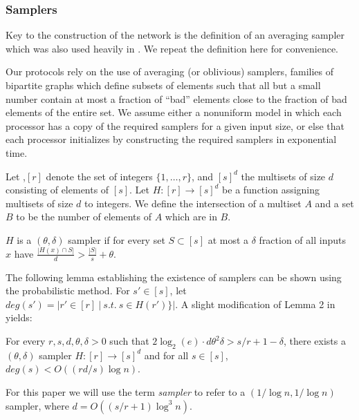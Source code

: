 \documentclass{sig-alternate}
\begin{document}
\subsubsection{Samplers}
Key to the construction of the network is the definition of an averaging sampler which was also used heavily in \cite{KKKSS-TALG,KSSV2}.
We repeat the definition here for convenience. 

Our protocols rely on the use of averaging (or
oblivious) samplers, families of bipartite graphs which define
subsets of elements such that all but a small number contain at
most a fraction of ``bad'' elements close to the fraction of bad
elements of the entire set.  We assume either a nonuniform model in
which each processor has a copy of the required samplers for a
given input size, or else that each processor initializes by
constructing the required samplers in exponential time.

\begin{definition}
Let ,$[r]$ denote the set of integers $\{1, \ldots, r\}$, and
$[s]^{d}$
 the multisets of size $d$ consisting of elements of $[s]$.
Let $H: [r] \rightarrow [s]^{d}$ be a function assigning
multisets 
of size $d$ to integers. We define the intersection of a multiset $A$ and a set $B$ to be the number of 
elements of $A$ which are in $B$.

$H$ is a $(\theta, \delta)$ sampler if
for every set $S \subset [s]$
at most a $\delta$ fraction of all inputs $x$ have
$\frac{|H(x) \cap S|}{d} > \frac{|S|}{s} + \theta$.
\end{definition}

\medskip

The following lemma establishing the existence of samplers
can be shown using the probabilistic method.  For $s'\in[s]$, 
let $deg(s')=|r'  \in[r] ~|~s.t.~ s \in H(r') \}|$.  A slight modification of Lemma 2 in \cite{KKKSS-TALG} yields:

\begin{lemma} \label{l:samp2}
For every $r,s,d, \theta, \delta > 0$ 
such that $2 \log_2(e) \cdot d \theta^2 \delta> s/r + 1-\delta$,
there exists a $(\theta, \delta)$
sampler $H: [r] \rightarrow [s]^{d}$ and for all $s \in [s]$, $deg(s) < O((rd/s) \log n)$.
 \end{lemma}

\medskip

For this paper we will use the term {\it sampler} to refer to a  $(1/\log n, 1/\log n)$ sampler, where $d=O( (s/r+1) \log^3 n)$.
\end{document}
